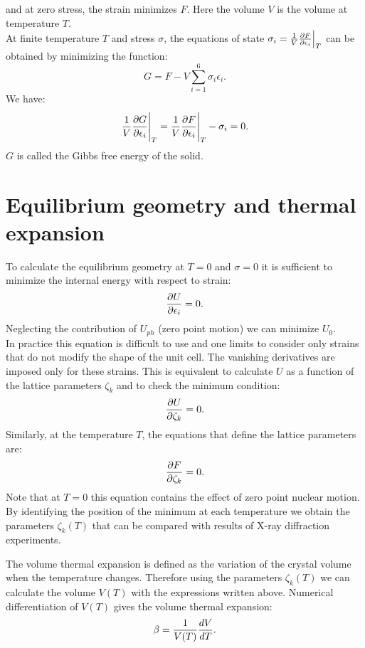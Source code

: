 \documentclass[12pt,a4paper]{article}
\begin{document}
and at zero stress, the strain minimizes $F$.
Here the volume $V$ is the volume at temperature $T$. \\
At finite temperature $T$ and stress $\sigma$, the equations of state
 $\sigma_i={1\over V}
{\partial F\over \partial \epsilon_i}\Big|_T$ can be obtained by 
minimizing the function:
\begin{equation}
G= F - V \sum_{i=1}^6 \sigma_i \epsilon_i.
\end{equation}
We have:
\begin{equation}
{1\over V} {\partial G \over \partial \epsilon_i}\Bigg |_T = {1\over V} 
{\partial F \over \partial \epsilon_i}\Bigg |_T - \sigma_i = 0.
\end{equation}
$G$ is called the Gibbs free energy of the solid.

\newpage
\section{\color{coral}Equilibrium geometry and thermal expansion}
To calculate the equilibrium geometry at $T=0$ and $\sigma=0$ it
is sufficient to minimize the internal energy with respect to strain:
\begin{equation}
{\partial U \over \partial \epsilon_i}=0.
\end{equation}
Neglecting the contribution of $U_{ph}$ (zero point motion) we can minimize 
$U_0$.\\
In practice this equation is difficult to use and one limits to consider
only strains that do not modify the shape of the unit cell. The
vanishing derivatives are imposed only for these strains.
This is equivalent to calculate $U$ as a function of the lattice parameters 
$\zeta_k$ and to check the minimum condition:
\begin{equation}
{\partial U \over \partial \zeta_k}=0.
\end{equation}
Similarly, at the temperature $T$, the equations that define the lattice 
parameters are:
\begin{equation}
{\partial F \over \partial \zeta_k}=0.
\end{equation}
Note that at $T=0$ this equation contains the effect of zero point nuclear
motion. By identifying the position of the minimum at each temperature 
we obtain the parameters $\zeta_k (T)$ that can be compared with
results of X-ray diffraction experiments.

The volume thermal expansion is defined as the variation of the crystal
volume when the temperature changes. Therefore using the parameters
$\zeta_k (T)$ we can calculate the volume $V(T)$
with the expressions written above.  
Numerical differentiation of $V(T)$ gives the volume thermal expansion:
\begin{equation}
\beta = {1 \over V(T)} {d V \over d T}.
\end{equation}
\end{document}

